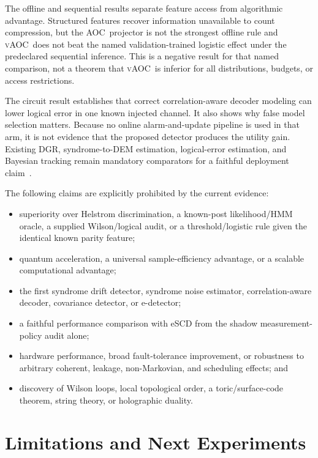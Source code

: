 \documentclass[letterpaper,journal]{IEEEtran}
\newcommand{\AOC}{\textsc{AOC}}
\newcommand{\vAOC}{\textsc{vAOC}}
\begin{document}
The offline and sequential results separate feature access from algorithmic
advantage. Structured features recover information unavailable to count
compression, but the \AOC\ projector is not the strongest offline rule and
\vAOC\ does not beat the named validation-trained logistic effect under the
predeclared sequential inference. This is a negative result for that named
comparison, not a theorem that \vAOC\ is inferior for all distributions,
budgets, or access restrictions.

The circuit result establishes that correct correlation-aware decoder
modeling can lower logical error in one known injected channel. It also shows
why false model selection matters. Because no online alarm-and-update pipeline
is used in that arm, it is not evidence that the proposed detector produces
the utility gain. Existing DGR, syndrome-to-DEM estimation, logical-error
estimation, and Bayesian tracking remain mandatory comparators for a faithful
deployment claim~\cite{wang2023dgr,blumekohout2025,takou2026,kobori2025}.

The following claims are explicitly prohibited by the current evidence:
\begin{itemize}
\item superiority over Helstrom discrimination, a known-post likelihood/HMM
oracle, a supplied Wilson/logical audit, or a threshold/logistic rule given
the identical known parity feature;
\item quantum acceleration, a universal sample-efficiency advantage, or a
scalable computational advantage;
\item the first syndrome drift detector, syndrome noise estimator,
correlation-aware decoder, covariance detector, or e-detector;
\item a faithful performance comparison with eSCD from the shadow
measurement-policy audit alone;
\item hardware performance, broad fault-tolerance improvement, or robustness
to arbitrary coherent, leakage, non-Markovian, and scheduling effects; and
\item discovery of Wilson loops, local topological order, a toric/surface-code
theorem, string theory, or holographic duality.
\end{itemize}

\section{Limitations and Next Experiments}
\end{document}
